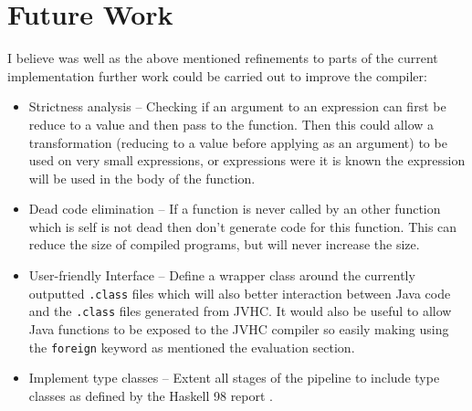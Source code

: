 \documentclass[float=false, crop=false]{standalone}
\begin{document}
\section{Future Work}

I believe was well as the above mentioned refinements to 
parts of the current implementation further work could be carried out 
to improve the compiler:

\begin{itemize}
  \item Strictness analysis -- Checking if an argument to an
    expression can first be reduce to a value and then pass
    to the function. Then this could allow a transformation 
    (reducing to a value before applying as an argument) to be used 
    on very small expressions, or expressions were it is known the expression 
    will be used in the body of the function.

  \item Dead code elimination -- If a function is never
    called by an other function which is self is not dead
    then don't generate code for this function. This can
    reduce the size of compiled programs, but will never
    increase the size.

  \item User-friendly Interface -- Define a wrapper class
    around the currently outputted \verb|.class| files
    which will also better interaction between Java code and the
    \verb|.class| files generated from JVHC. It would also
    be useful to allow Java functions to be exposed to the JVHC 
    compiler so easily making using the \verb|foreign| keyword 
    as mentioned the evaluation section.

  \item Implement type classes -- Extent all stages of the pipeline to 
    include type classes as defined by the Haskell 98 report 
    \cite{haskell98-spec}.
\end{itemize}
\end{document}
